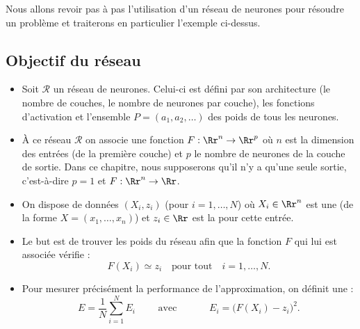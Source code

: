 Nous allons revoir pas à pas l'utilisation d'un réseau de neurones pour résoudre un problème et traiterons en particulier l'exemple ci-dessus.

\subsection{Objectif du réseau}

\begin{itemize}
	\item Soit $\mathcal{R}$ un réseau de neurones. Celui-ci est défini par son architecture (le nombre de couches, le nombre de neurones par couche), les fonctions d'activation et l'ensemble $P = (a_1,a_2,\ldots)$ des poids de tous les neurones.
	
	\item \`A ce réseau $\mathcal{R}$ on associe une fonction $F : \Rr^n \to \Rr^p$ où $n$ est la dimension des entrées (de la première couche) et $p$ le nombre de neurones de la couche de sortie.
	Dans ce chapitre, nous supposerons qu'il n'y a qu'une seule sortie, c'est-à-dire $p=1$ et $F : \Rr^n \to \Rr$.
	
	
	
	\item On dispose de données $(X_i,z_i)$ (pour $i=1,\ldots,N$) où $X_i \in \Rr^n$ est une  (de la forme $X=(x_1,\ldots,x_n)$) et $z_i \in \Rr$ est la  pour cette entrée.
	
	\item Le but est de trouver les poids du réseau afin que la fonction $F$ qui lui est associée vérifie :
	$$F(X_i) \simeq z_i \quad \text{pour tout} \quad i=1,\ldots,N.$$ 
	
	\item Pour mesurer précisément la performance de l'approximation, on définit une  :
	$$E = \frac{1}N \sum_{i=1}^N E_i \qquad \text{ avec } \qquad \quad E_i = \big( F(X_i) - z_i \big)^2.$$
\end{itemize}


